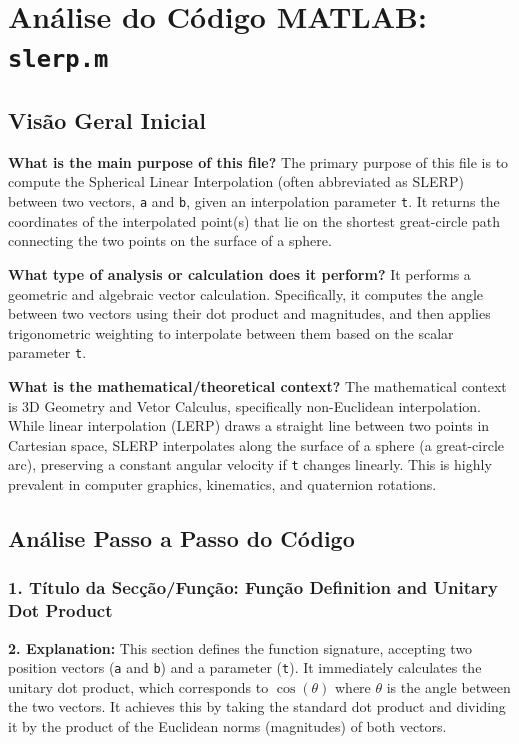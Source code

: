 
\chapter{Análise do Código MATLAB: \texttt{slerp.m}}
\section{Visão Geral Inicial}

\textbf{What is the main purpose of this file?}
The primary purpose of this file is to compute the Spherical Linear Interpolation (often abbreviated as SLERP) between two vectors, \texttt{a} and \texttt{b}, given an interpolation parameter \texttt{t}. It returns the coordinates of the interpolated point(s) that lie on the shortest great-circle path connecting the two points on the surface of a sphere.

\textbf{What type of analysis or calculation does it perform?}
It performs a geometric and algebraic vector calculation. Specifically, it computes the angle between two vectors using their dot product and magnitudes, and then applies trigonometric weighting to interpolate between them based on the scalar parameter \texttt{t}.

\textbf{What is the mathematical/theoretical context?}
The mathematical context is 3D Geometry and Vetor Calculus, specifically non-Euclidean interpolation. While linear interpolation (LERP) draws a straight line between two points in Cartesian space, SLERP interpolates along the surface of a sphere (a great-circle arc), preserving a constant angular velocity if \texttt{t} changes linearly. This is highly prevalent in computer graphics, kinematics, and quaternion rotations.

\section{Análise Passo a Passo do Código}

\subsection*{1. Título da Secção/Função: Função Definition and Unitary Dot Product}
\textbf{2. Explanation:} This section defines the function signature, accepting two position vectors (\texttt{a} and \texttt{b}) and a parameter (\texttt{t}). It immediately calculates the unitary dot product, which corresponds to $\cos(\theta)$ where $\theta$ is the angle between the two vectors. It achieves this by taking the standard dot product and dividing it by the product of the Euclidean norms (magnitudes) of both vectors.

